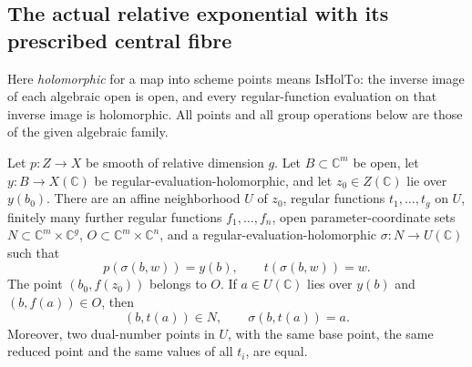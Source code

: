 \subsection{The actual relative exponential with its prescribed central fibre}
\label{subsec:ftb-actual-relative-exponential}

Here \emph{holomorphic} for a map into scheme points means
\(\mathrm{IsHolTo}\): the inverse image of each algebraic open
is open, and every regular-function evaluation on that
inverse image is holomorphic.
All points and all group operations below are those of the
given algebraic family.

\begin{srlemma}
\label{lem:ftb-relative-affine-coordinates}
Let \(p:Z\to X\) be smooth of relative dimension \(g\).
Let \(B\subset\mathbb C^m\) be open, let
\(y:B\to X(\mathbb C)\) be regular-evaluation-holomorphic,
and let \(z_0\in Z(\mathbb C)\) lie over \(y(b_0)\).
There are an affine neighborhood \(U\) of \(z_0\), regular
functions \(t_1,\ldots,t_g\) on \(U\), finitely many further
regular functions \(f_1,\ldots,f_n\), open parameter-coordinate
sets \(N\subset\mathbb C^m\times\mathbb C^g\),
\(O\subset\mathbb C^m\times\mathbb C^n\), and a
regular-evaluation-holomorphic \(\sigma:N\to U(\mathbb C)\)
such that
\[
 p(\sigma(b,w))=y(b),\qquad t(\sigma(b,w))=w.                 \tag{RE1}
\]
The point \((b_0,f(z_0))\) belongs to \(O\).
If \(a\in U(\mathbb C)\) lies over \(y(b)\) and
\((b,f(a))\in O\), then
\[
                (b,t(a))\in N,\qquad \sigma(b,t(a))=a.       \tag{RE2}
\]
Moreover, two dual-number points in \(U\), with the same
base point, the same reduced point and the same values of
all \(t_i\), are equal.
\end{srlemma}
